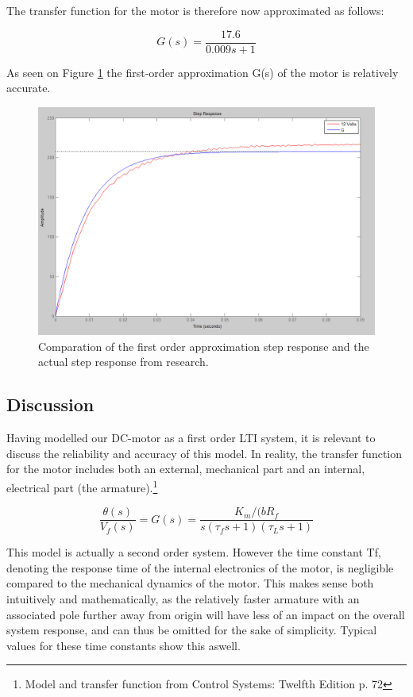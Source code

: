 The transfer function for the motor is therefore now approximated as follows:

\begin{equation}
G(s)=\frac{17.6}{0.009s+1}
\end{equation}

As seen on Figure \ref{fig:FirstOrderApproximation} the first-order approximation G(s) of the motor is relatively accurate.

\begin{figure}[h!]
\centering
\includegraphics[scale=0.35]{Billeder/FirstOrderApproximation.png}
\caption{Comparation of the first order approximation step response and the actual step response from research.}
\label{fig:FirstOrderApproximation}
\end{figure}

\subsection{Discussion}
Having modelled our DC-motor as a first order LTI system, it is relevant to discuss the reliability and accuracy of this model. In reality, the transfer function for the motor includes both an external, mechanical part and an internal, electrical part (the armature).\footnote{Model and transfer function from Control Systems: Twelfth Edition p. 72}

\begin{equation}
\frac{\theta(s)}{V_f (s)}=G(s)=\frac{K_m / (bR_f}{s(\tau_f s+1)(\tau_L s+1)}
\end{equation}

This model is actually a second order system. However the time constant Tf, denoting the response time of the internal electronics of the motor, is negligible compared to the mechanical dynamics of the motor. This makes sense both intuitively and mathematically, as the relatively faster armature with an associated pole further away from origin will have less of an impact on the overall system response, and can thus be omitted for the sake of simplicity. Typical values for these time constants show this aswell.

